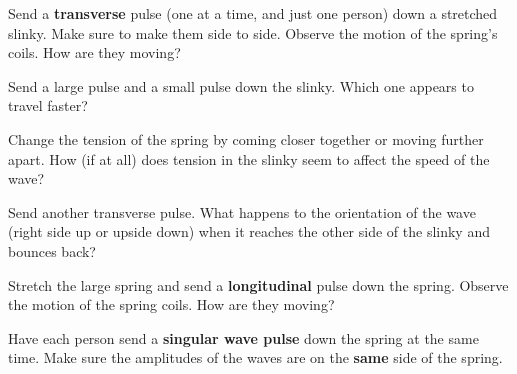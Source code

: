 \documentclass[10pt]{exam}
\begin{document}
\begin{questions}

  
  \question
    Send a {\bf transverse} pulse (one at a time, and just one person) down a stretched slinky.  Make sure to make them side to side. Observe the motion of the spring's coils. How are they moving?
    \vs 
  
  \question
    Send a large pulse and a small pulse down the slinky. Which one appears to travel faster? 
    \vs
  
  
  
  \question
    Change the tension of the spring by coming closer together or moving further apart.  How (if at all) does tension in the slinky seem to affect the speed of the wave?
    \vs
  
  \question
    Send another transverse pulse.  What happens to the orientation of the wave (right side up or upside down) when it reaches the other side of the slinky and bounces back?
    \vs
  
  \question
    Stretch the large spring and send a {\bf longitudinal} pulse down the spring.  Observe the motion of the spring coils.  How are they moving?
    \vs
  
  \pagebreak

  
  
  \question
    Have each person send a {\bf singular wave pulse} down the spring at the same time.  Make sure the amplitudes of the waves are on the {\bf same} side of the spring.  
  
\end{questions}
\end{document}
